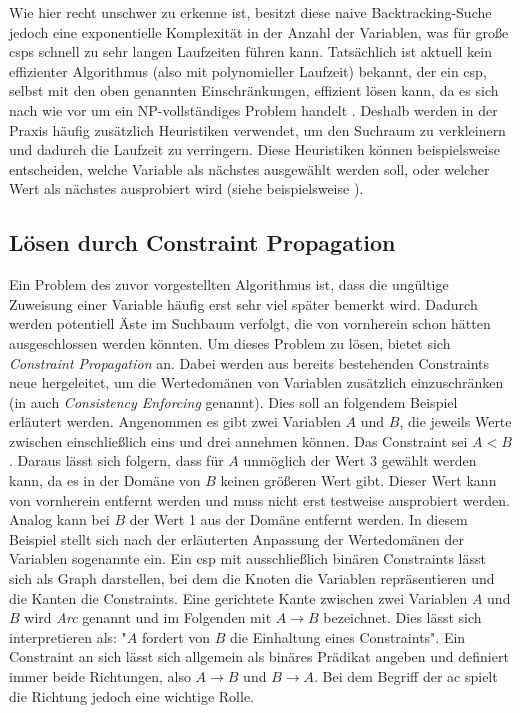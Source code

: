 Wie hier recht unschwer zu erkenne ist, besitzt diese naive Backtracking-Suche jedoch eine exponentielle Komplexität in der Anzahl der Variablen,
was für große \acp*{csp} schnell zu sehr langen Laufzeiten führen kann. Tatsächlich ist aktuell kein effizienter Algorithmus (also mit polynomieller Laufzeit) bekannt, der ein
\ac*{csp}, selbst mit den oben genannten Einschränkungen, effizient lösen kann, da es sich nach wie vor um ein NP-vollständiges Problem handelt \cite{BestCSPSearch}. Deshalb
werden in der Praxis häufig zusätzlich Heuristiken verwendet, um den Suchraum zu verkleinern und dadurch die Laufzeit zu verringern. Diese Heuristiken können beispielsweise
entscheiden, welche Variable als nächstes ausgewählt werden soll, oder welcher Wert als nächstes ausprobiert wird (siehe beispielsweise \cite{OrderingHeuristics}).

\subsection{Lösen durch Constraint Propagation}
\label{sec:ConstrProp}
Ein Problem des zuvor vorgestellten Algorithmus ist, dass die ungültige Zuweisung einer Variable häufig erst sehr viel später bemerkt wird. Dadurch werden potentiell Äste im
Suchbaum verfolgt, die von vornherein schon hätten ausgeschlossen werden könnten. Um dieses Problem zu lösen, bietet sich \textit{Constraint Propagation} an. Dabei werden
aus bereits bestehenden Constraints neue hergeleitet, um die Wertedomänen von Variablen zusätzlich einzuschränken (in \cite{OrderingHeuristics} auch \textit{Consistency
Enforcing} genannt). Dies soll an folgendem Beispiel erläutert werden. Angenommen es gibt zwei Variablen $A$ und $B$, die jeweils Werte zwischen einschließlich eins und drei
annehmen können. Das Constraint sei $A < B$. Daraus lässt sich folgern, dass für $A$ unmöglich der Wert 3 gewählt werden kann, da es in der Domäne von $B$ keinen größeren
Wert gibt. Dieser Wert kann von vornherein entfernt werden und muss nicht erst testweise ausprobiert werden. Analog kann bei $B$ der Wert 1 aus der Domäne entfernt werden. In
diesem Beispiel stellt sich nach der erläuterten Anpassung der Wertedomänen der Variablen sogenannte  ein. Ein \ac*{csp} mit ausschließlich binären Constraints lässt 
sich als Graph darstellen, bei dem die Knoten die Variablen repräsentieren und die Kanten die Constraints. Eine gerichtete Kante zwischen zwei Variablen $A$ und $B$ wird 
\textit{Arc} genannt und im Folgenden mit $A \rightarrow B$ bezeichnet. Dies lässt sich interpretieren als: "$A$ fordert von $B$ die Einhaltung eines Constraints". Ein
Constraint an sich lässt sich allgemein als binäres Prädikat angeben und definiert immer beide Richtungen, also $A \rightarrow B$ und $B \rightarrow A$. Bei dem Begriff
der \acl*{ac} spielt die Richtung jedoch eine wichtige Rolle.

